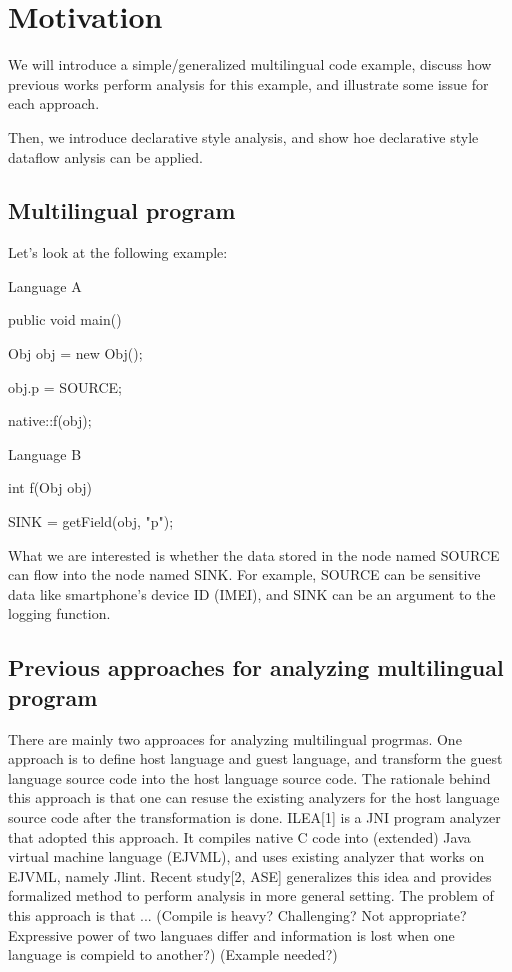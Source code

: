 \section{Motivation}
We will introduce a simple/generalized multilingual code example,
discuss how previous works perform analysis for this example,
and illustrate some issue for each approach.

Then, we introduce declarative style analysis,
and show hoe declarative style dataflow anlysis can be applied.

\subsection{Multilingual program}
Let's look at the following example:

Language A

public void main() {

  Obj obj = new Obj();

  obj.p = SOURCE;

  native::f(obj);

}

Language B

int f(Obj obj) {

  SINK = getField(obj, "p");
  
}

What we are interested is whether the data stored in the node named SOURCE
can flow into the node named SINK. For example, SOURCE can be sensitive data like
smartphone's device ID (IMEI), and SINK can be an argument to the logging function.

\subsection{Previous approaches for analyzing multilingual program} There are
mainly two approaces for analyzing multilingual progrmas. One approach is to
define host language and guest language, and transform the guest language
source code into the host language source code. The rationale behind this
approach is that one can resuse the existing analyzers for the host language
source code after the transformation is done.  ILEA[1] is a JNI program
analyzer that adopted this approach. It compiles native C code into (extended)
Java virtual machine language (EJVML), and uses existing analyzer that works on
EJVML, namely Jlint.  Recent study[2, ASE] generalizes this idea and provides
formalized method to perform analysis in more general setting.  The problem of
this approach is that ... (Compile is heavy? Challenging? Not appropriate?
Expressive power of two languaes differ and information is lost when one
language is compield to another?) (Example needed?)

